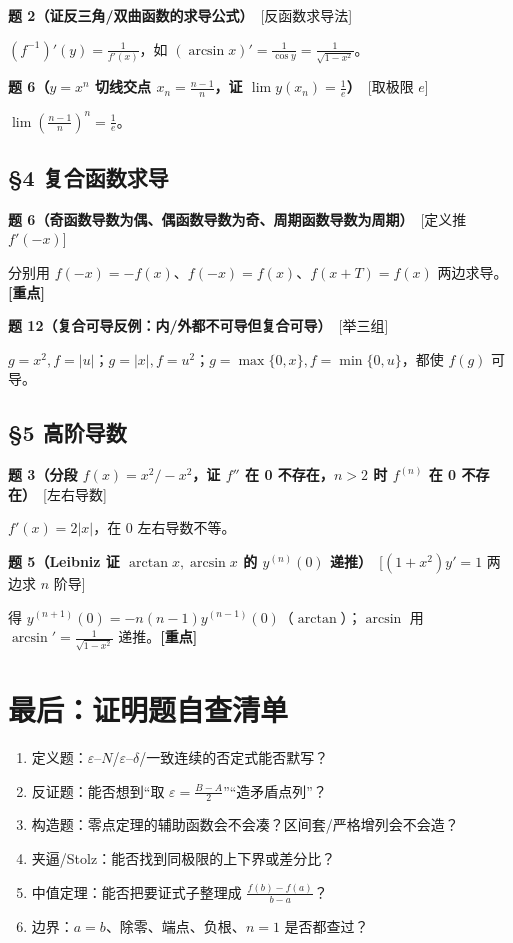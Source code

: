 \documentclass[11pt,a4paper,UTF8]{ctexart}
\newcommand{\eps}{\varepsilon}
\newcommand{\p}[2]{\par\smallskip\noindent\textbf{#1}\ \textcolor{blue!55!black}{[#2]}\par\nopagebreak}
\begin{document}
\p{题 2（证反三角/双曲函数的求导公式）}{反函数求导法}
$(f^{-1})'(y)=\frac1{f'(x)}$，如 $(\arcsin x)'=\frac1{\cos y}=\frac1{\sqrt{1-x^2}}$。

\p{题 6（$y=x^n$ 切线交点 $x_n=\frac{n-1}n$，证 $\lim y(x_n)=\frac1e$）}{取极限 $e$}
$\lim(\frac{n-1}n)^n=\frac1e$。

\subsection*{§4 复合函数求导}
\p{题 6（奇函数导数为偶、偶函数导数为奇、周期函数导数为周期）}{定义推 $f'(-x)$}
分别用 $f(-x)=-f(x)$、$f(-x)=f(x)$、$f(x+T)=f(x)$ 两边求导。\textbf{[重点]}

\p{题 12（复合可导反例：内/外都不可导但复合可导）}{举三组}
$g=x^2,f=|u|$；$g=|x|,f=u^2$；$g=\max\{0,x\},f=\min\{0,u\}$，都使 $f(g)$ 可导。

\subsection*{§5 高阶导数}
\p{题 3（分段 $f(x)=x^2/-x^2$，证 $f''$ 在 0 不存在，$n>2$ 时 $f^{(n)}$ 在 0 不存在）}{左右导数}
$f'(x)=2|x|$，在 0 左右导数不等。

\p{题 5（Leibniz 证 $\arctan x,\arcsin x$ 的 $y^{(n)}(0)$ 递推）}{$(1+x^2)y'=1$ 两边求 $n$ 阶导}
得 $y^{(n+1)}(0)=-n(n-1)y^{(n-1)}(0)$（$\arctan$）；$\arcsin$ 用 $\arcsin'=\frac1{\sqrt{1-x^2}}$ 递推。\textbf{[重点]}

\section{最后：证明题自查清单}
\begin{enumerate}[leftmargin=1.4em]
\item 定义题：$\eps$–$N$/$\eps$–$\delta$/一致连续的否定式能否默写？
\item 反证题：能否想到“取 $\eps=\frac{B-A}2$”“造矛盾点列”？
\item 构造题：零点定理的辅助函数会不会凑？区间套/严格增列会不会造？
\item 夹逼/Stolz：能否找到同极限的上下界或差分比？
\item 中值定理：能否把要证式子整理成 $\frac{f(b)-f(a)}{b-a}$？
\item 边界：$a=b$、除零、端点、负根、$n=1$ 是否都查过？
\end{enumerate}
\end{document}

